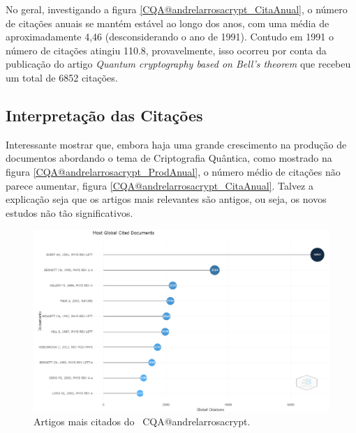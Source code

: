 No geral, investigando a figura \ref{CQA@andrelarrosacrypt_CitaAnual}, o número de citações anuais se mantém estável ao longo dos anos, com uma média de aproximadamente 4,46 (desconsiderando o ano de 1991). Contudo em 1991 o número de citações atingiu 110.8, provavelmente, isso ocorreu por conta da publicação do artigo \textit{Quantum cryptography based on Bell’s theorem} que recebeu um total de 6852 citações.

\subsection{Interpretação das Citações}

Interessante mostrar que, embora haja uma grande crescimento na produção de documentos abordando o tema de Criptografia Quântica, como mostrado na figura \ref{CQA@andrelarrosacrypt_ProdAnual}, o número médio de citações não parece aumentar, figura \ref{CQA@andrelarrosacrypt_CitaAnual}. Talvez a explicação seja que os artigos mais relevantes são antigos, ou seja, os novos estudos não tão significativos.

\begin{figure}
    \centering
    \includegraphics[width=1\textwidth]{experiments/andrelarrosacrypt/AnaliseBibliometrica/CriptografiaQuantica/imagens/CQA@andrelarrosacrypt_MostCit.png}
    \caption{Artigos mais citados do \dataset\ CQA@andrelarrosacrypt.}
    \label{CQA@andrelarrosacrypt_MostCit}
\end{figure}

